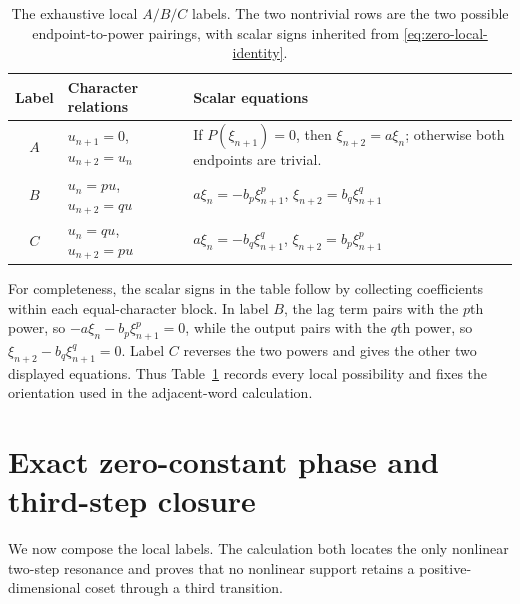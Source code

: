 \documentclass[11pt]{article}
\theoremstyle{definition}
\theoremstyle{remark}
\begin{document}
\begin{table}[t]
\centering
\small
\renewcommand{\arraystretch}{1.18}
\begin{tabularx}{\textwidth}{@{}c X X@{}}
\toprule
Label & Character relations & Scalar equations \\
\midrule
$A$ & $u_{n+1}=0$, $u_{n+2}=u_n$ & If $P(\xi_{n+1})=0$, then $\xi_{n+2}=a\xi_n$; otherwise both endpoints are trivial. \\
$B$ & $u_n=pu$, $u_{n+2}=qu$ & $a\xi_n=-b_p\xi_{n+1}^{p}$, $\xi_{n+2}=b_q\xi_{n+1}^{q}$ \\
$C$ & $u_n=qu$, $u_{n+2}=pu$ & $a\xi_n=-b_q\xi_{n+1}^{q}$, $\xi_{n+2}=b_p\xi_{n+1}^{p}$ \\
\bottomrule
\end{tabularx}
\caption{The exhaustive local $A/B/C$ labels.  The two nontrivial rows are the two possible endpoint-to-power pairings, with scalar signs inherited from \eqref{eq:zero-local-identity}.}
\label{tab:ABC}
\end{table}

For completeness, the scalar signs in the table follow by collecting coefficients within each equal-character block.  In label $B$, the lag term pairs with the $p$th power, so
$-a\xi_n-b_p\xi_{n+1}^p=0$, while the output pairs with the $q$th power, so
$\xi_{n+2}-b_q\xi_{n+1}^q=0$.  Label $C$ reverses the two powers and gives the other two displayed equations.  Thus Table~\ref{tab:ABC} records every local possibility and fixes the orientation used in the adjacent-word calculation.

\section{Exact zero-constant phase and third-step closure}
\label{sec:phase}

We now compose the local labels.  The calculation both locates the only nonlinear two-step resonance and proves that no nonlinear support retains a positive-dimensional coset through a third transition.
\end{document}
